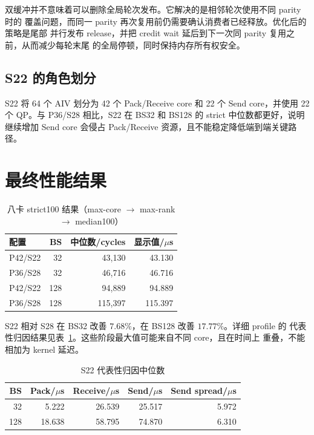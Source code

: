 \documentclass[UTF8,a4paper,11pt]{ctexart}
\begin{document}
双缓冲并不意味着可以删除全局轮次发布。它解决的是相邻轮次使用不同 parity 时的
覆盖问题，而同一 parity 再次复用前仍需要确认消费者已经释放。优化后的策略是尾部
并行发布 release，并把 credit wait 延后到下一次同 parity 复用之前，从而减少每轮末尾
的全局停顿，同时保持内存所有权安全。

\subsection{S22 的角色划分}

S22 将 64 个 AIV 划分为 42 个 Pack/Receive core 和 22 个 Send core，并使用 22 个
QP。与 P36/S28 相比，S22 在 BS32 和 BS128 的 strict 中位数都更好，说明继续增加
Send core 会侵占 Pack/Receive 资源，且不能稳定降低端到端关键路径。

\section{最终性能结果}

\begin{table}[htbp]
\centering
\caption{八卡 strict100 结果（max-core $\rightarrow$ max-rank $\rightarrow$ median100）}
\begin{tabular}{lrrr}
\toprule
配置 & BS & 中位数/cycles & 显示值/$\mu$s \\
\midrule
P42/S22 & 32  & 43,130  & 43.130 \\
P36/S28 & 32  & 46,716  & 46.716 \\
P42/S22 & 128 & 94,889  & 94.889 \\
P36/S28 & 128 & 115,397 & 115.397 \\
\bottomrule
\end{tabular}
\end{table}

S22 相对 S28 在 BS32 改善 $7.68\%$，在 BS128 改善 $17.77\%$。详细 profile 的
代表性归因结果见表~\ref{tab:stages}。这些阶段最大值可能来自不同 core，且在时间上
重叠，不能相加为 kernel 延迟。

\begin{table}[htbp]
\centering
\caption{S22 代表性归因中位数}
\label{tab:stages}
\begin{tabular}{rrrrr}
\toprule
BS & Pack/$\mu$s & Receive/$\mu$s & Send/$\mu$s & Send spread/$\mu$s \\
\midrule
32  & 5.222  & 26.539 & 25.517 & 5.972 \\
128 & 18.638 & 58.795 & 74.870 & 6.310 \\
\bottomrule
\end{tabular}
\end{table}
\end{document}

